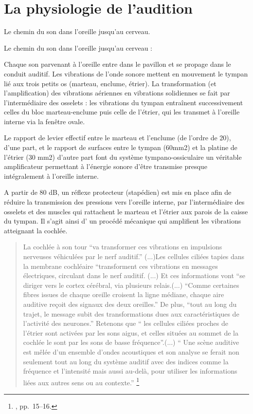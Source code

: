 \section{La physiologie de l'audition}
Le chemin du son dans l'oreille jusqu'au cerveau.


Le chemin du son dans l'oreille jusqu'au cerveau : 

Chaque son parvenant à l'oreille entre dans le pavillon et se propage
dans le conduit auditif. Les vibrations de l'onde sonore mettent en
mouvement le tympan lié aux trois petits os (marteau, enclume, étrier).
La transformation (et l\textquoteright amplification) des vibrations
aériennes en vibrations solidiennes se fait par l\textquoteright intermédiaire
des osselets : les vibrations du tympan entraînent successivement
celles du bloc marteau-enclume puis celle de l\textquoteright étrier,
qui les transmet à l\textquoteright oreille interne via la fenêtre
ovale.

Le rapport de levier effectif entre le marteau et l\textquoteright enclume
(de l\textquoteright ordre de 20), d\textquoteright une part, et le
rapport de surfaces entre le tympan (60mm2) et la platine de l\textquoteright étrier
(30 mm2) d\textquoteright autre part font du système tympano-ossiculaire
un véritable amplificateur permettant à l\textquoteright énergie sonore
d\textquoteright être transmise presque intégralement à l\textquoteright oreille
interne.

A partir de 80 dB, un réflexe protecteur (stapédien) est mis en place
afin de réduire la transmission des pressions vers l\textquoteright oreille
interne, par l\textquoteright intermédiaire des osselets et des muscles
qui rattachent le marteau et l\textquoteright étrier aux parois de
la caisse du tympan. Il s'agit ainsi d' un procédé mécanique qui amplifient
les vibrations atteignant la cochlée. 
\begin{quotation}
	La cochlée à son tour ``va transformer ces vibrations en impulsions
	nerveuses véhiculées par le nerf auditif.'' (...)Les cellules ciliées
	tapies dans la membrane cochléaire ``transforment ces vibrations
	en messages électriques, circulant dans le nerf auditif. (...) Et
	ces informations vont ``se diriger vers le cortex cérébral, via plusieurs
	relais.(...) ``Comme certaines fibres issues de chaque oreille croisent
	la ligne médiane, chaque aire auditive reçoit des signaux des deux
	oreilles.'' De plus, ``tout au long du trajet, le message subit
	des transformations dues aux caractéristiques de l'activité des neurones.''
	Retenons que `` les cellules ciliées proches de l'étrier sont activées
	par les sons aigus, et celles situées au sommet de la cochlée le sont
	par les sons de basse fréquence''.(...) `` Une scène auditive est
	mêlée d'un ensemble d'ondes acoustiques et son analyse se ferait non
	seulement tout au long du système auditif avec des indices comme la
	fréquence et l'intensité mais aussi au-delà, pour utiliser les informations
	liées aux autres sens ou au contexte.'' \footnote{\cite{AuteurInconnu2011}, pp.~15--16.}
\end{quotation}



